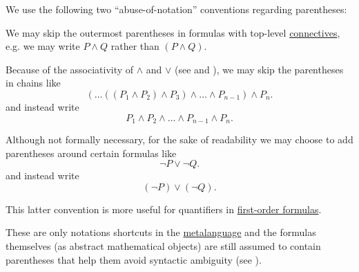 \begin{remark}\label{rem:propositional_formula_parentheses}
  We use the following two \enquote{abuse-of-notation} conventions regarding parentheses:
  \begin{thmenum}
     We may skip the outermost parentheses in formulas with top-level \hyperref[def:propositional_language/connectives]{connectives}, e.g. we may write \( P \wedge Q \) rather than \( (P \wedge Q) \).

     Because of the associativity of \( \wedge \) and \( \vee \) (see  and ), we may skip the parentheses in chains like
    \begin{equation*}
      ( \ldots ((P_1 \wedge P_2) \wedge P_3) \wedge \ldots \wedge P_{n-1} ) \wedge P_n.
    \end{equation*}
    and instead write
    \begin{equation*}
      P_1 \wedge P_2 \wedge \ldots \wedge P_{n-1} \wedge P_n.
    \end{equation*}

     Although not formally necessary, for the sake of readability we may choose to add parentheses around certain formulas like
    \begin{equation*}
      \neg P \vee \neg Q.
    \end{equation*}
    and instead write
    \begin{equation*}
      (\neg P) \vee (\neg Q).
    \end{equation*}

    This latter convention is more useful for quantifiers in \hyperref[def:first_order_syntax/formula]{first-order formulas}.
  \end{thmenum}

  These are only notations shortcuts in the \hyperref[sec:mathematical_logic]{metalanguage} and the formulas themselves (as abstract mathematical objects) are still assumed to contain parentheses that help them avoid syntactic ambiguity (see ).
\end{remark}

